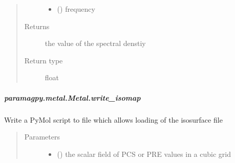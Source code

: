 \documentclass[a4paper,10pt,english,openany,oneside]{sphinxmanual}
\begin{document}
\begin{fulllineitems}
\begin{fulllineitems}
\begin{fulllineitems}
\begin{quote}
\begin{description}
\begin{itemize}
\item {} 
\sphinxAtStartPar
{} () \textendash{} frequency

\end{itemize}

\item[{Returns}] \leavevmode
\sphinxAtStartPar
{} \textendash{} the value of the spectral denstiy

\item[{Return type}] \leavevmode
\sphinxAtStartPar
float

\end{description}\end{quote}

\end{fulllineitems}



\subparagraph{paramagpy.metal.Metal.write\_isomap}
\label{\detokenize{reference/generated/paramagpy.metal.Metal.write_isomap:paramagpy-metal-metal-write-isomap}}\label{\detokenize{reference/generated/paramagpy.metal.Metal.write_isomap::doc}}

\begin{fulllineitems}
\label{\detokenize{reference/generated/paramagpy.metal.Metal.write_isomap:paramagpy.metal.Metal.write_isomap}}
\sphinxAtStartPar
Write a PyMol script to file which allows loading of the
isosurface file
\begin{quote}\begin{description}
\item[{Parameters}] \leavevmode\begin{itemize}
\item {} 
\sphinxAtStartPar
{} () \textendash{} the scalar field of PCS or PRE values in a cubic grid


\end{itemize}
\end{description}
\end{quote}
\end{fulllineitems}
\end{fulllineitems}
\end{fulllineitems}
\end{document}
